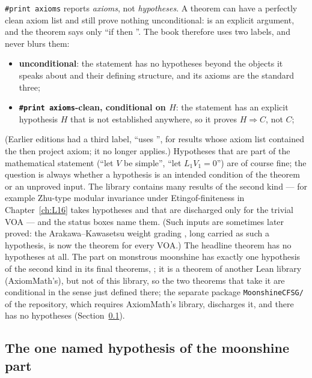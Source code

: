 \texttt{\#print axioms} reports \emph{axioms}, not \emph{hypotheses}. A theorem
 can have a perfectly clean axiom list and still
prove nothing unconditional:  is an explicit argument, and the theorem says only ``if
 then ''. The book therefore uses two labels, and never
blurs them:
\begin{itemize}
\item \textbf{unconditional}: the statement has no hypotheses beyond the objects it speaks about and
  their defining structure, and its axioms are the standard three;
\item \textbf{\texttt{\#print axioms}-clean, conditional on $H$}: the statement has an explicit
  hypothesis $H$ that is not established anywhere, so it proves $H\Rightarrow C$, not $C$;
\end{itemize}
(Earlier editions had a third label, ``uses '', for results whose axiom list contained
the then project axiom; it no longer applies.)
Hypotheses that are part of the mathematical statement (``let $V$ be simple'', ``let
$L_1V_1 = 0$'') are of course fine; the question is always whether a hypothesis is an intended
condition of the theorem or an unproved input. The library contains many results of the second kind
--- for example Zhu-type modular invariance under Etingof-finiteness in
Chapter~\ref{ch:L16} takes hypotheses  and  that are discharged only for the trivial
VOA --- and the status boxes name them. (Such inputs are sometimes later proved: the Arakawa--Kawasetsu weight grading
, long carried as such a hypothesis, is now the theorem  for every VOA.) The headline theorem  has no hypotheses at all.
The part on monstrous moonshine has exactly one hypothesis of the second kind in its final theorems, ;
it is a theorem of another Lean library (AxiomMath's), but not of this library, so the two theorems that take it are
conditional in the sense just defined there; the separate package \texttt{MoonshineCFSG/} of the repository, which
requires AxiomMath's library, discharges it, and there  has no hypotheses
(Section~\ref{ch01:sec:gmat}).

\subsection{The one named hypothesis of the moonshine part}\label{ch01:sec:gmat}

